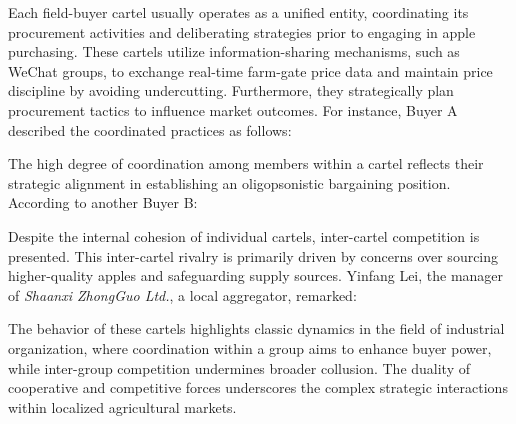 Each field-buyer cartel usually operates as a unified entity, coordinating its procurement activities and deliberating strategies prior to engaging in apple purchasing. These cartels utilize information-sharing mechanisms, such as WeChat groups, to exchange real-time farm-gate price data and maintain price discipline by avoiding undercutting. Furthermore, they strategically plan procurement tactics to influence market outcomes. For instance, Buyer A described the coordinated practices as follows:

\begin{quote}
\end{quote}

The high degree of coordination among members within a cartel reflects their strategic alignment in establishing an oligopsonistic bargaining position. According to another Buyer B:

\begin{quote}
\end{quote}

Despite the internal cohesion of individual cartels, inter-cartel competition is presented. This inter-cartel rivalry is primarily driven by concerns over sourcing higher-quality apples and safeguarding supply sources. Yinfang Lei, the manager of \textit{Shaanxi ZhongGuo Ltd.}, a local aggregator, remarked:

\begin{quote}
\end{quote}

The behavior of these cartels highlights classic dynamics in the field of industrial organization, where coordination within a group aims to enhance buyer power, while inter-group competition undermines broader collusion. The duality of cooperative and competitive forces underscores the complex strategic interactions within localized agricultural markets.



